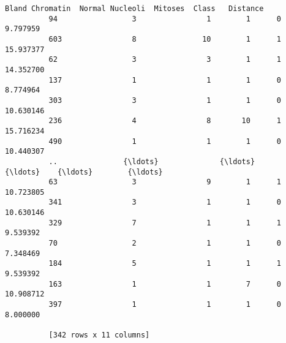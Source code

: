 \documentclass[11pt]{article}
\begin{document}
\begin{Verbatim}[commandchars=\\\{\}]
               Bland Chromatin  Normal Nucleoli  Mitoses  Class   Distance  
          94                 3                1        1      0   9.797959  
          603                8               10        1      1  15.937377  
          62                 3                3        1      1  14.352700  
          137                1                1        1      0   8.774964  
          303                3                1        1      0  10.630146  
          236                4                8       10      1  15.716234  
          490                1                1        1      0  10.440307  
          ..               {\ldots}              {\ldots}      {\ldots}    {\ldots}        {\ldots}  
          63                 3                9        1      1  10.723805  
          341                3                1        1      0  10.630146  
          329                7                1        1      1   9.539392  
          70                 2                1        1      0   7.348469  
          184                5                1        1      1   9.539392  
          163                1                1        7      0  10.908712  
          397                1                1        1      0   8.000000  
          
          [342 rows x 11 columns]
\end{Verbatim}
            

    
    
    
    
\end{document}
